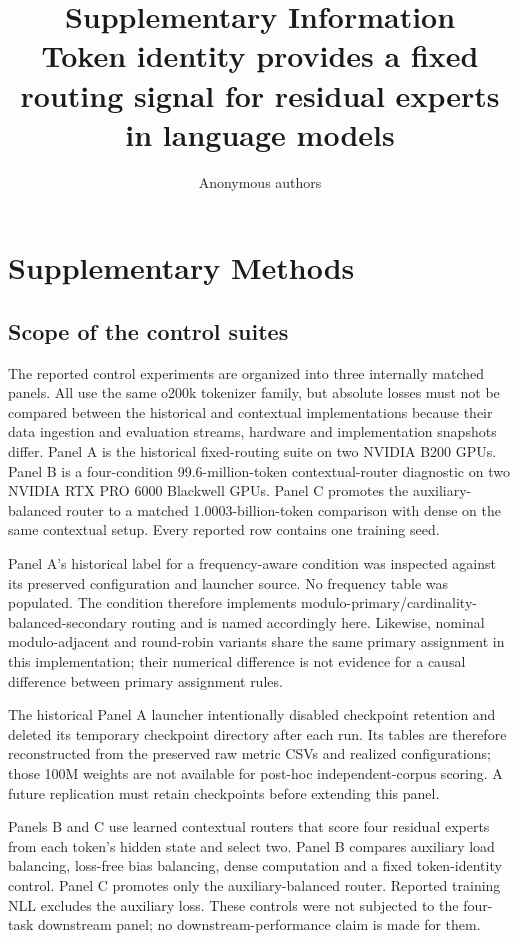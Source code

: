 \documentclass[11pt]{article}
\title{Supplementary Information\\Token identity provides a fixed routing signal for residual experts in language models}
\author{Anonymous authors}
\date{}
\begin{document}
\maketitle
\renewcommand{\tablename}{Supplementary Table}

\section*{Supplementary Methods}

\subsection*{Scope of the control suites}

The reported control experiments are organized into three internally matched panels. All use the same o200k tokenizer family, but absolute losses must not be compared between the historical and contextual implementations because their data ingestion and evaluation streams, hardware and implementation snapshots differ. Panel A is the historical fixed-routing suite on two NVIDIA B200 GPUs. Panel B is a four-condition 99.6-million-token contextual-router diagnostic on two NVIDIA RTX PRO 6000 Blackwell GPUs. Panel C promotes the auxiliary-balanced router to a matched 1.0003-billion-token comparison with dense on the same contextual setup. Every reported row contains one training seed.

Panel A's historical label for a frequency-aware condition was inspected against its preserved configuration and launcher source. No frequency table was populated. The condition therefore implements modulo-primary/cardinality-balanced-secondary routing and is named accordingly here. Likewise, nominal modulo-adjacent and round-robin variants share the same primary assignment in this implementation; their numerical difference is not evidence for a causal difference between primary assignment rules.

The historical Panel A launcher intentionally disabled checkpoint retention and deleted its temporary checkpoint directory after each run. Its tables are therefore reconstructed from the preserved raw metric CSVs and realized configurations; those 100M weights are not available for post-hoc independent-corpus scoring. A future replication must retain checkpoints before extending this panel.

Panels B and C use learned contextual routers that score four residual experts from each token's hidden state and select two. Panel B compares auxiliary load balancing, loss-free bias balancing, dense computation and a fixed token-identity control. Panel C promotes only the auxiliary-balanced router. Reported training NLL excludes the auxiliary loss. These controls were not subjected to the four-task downstream panel; no downstream-performance claim is made for them.
\end{document}
